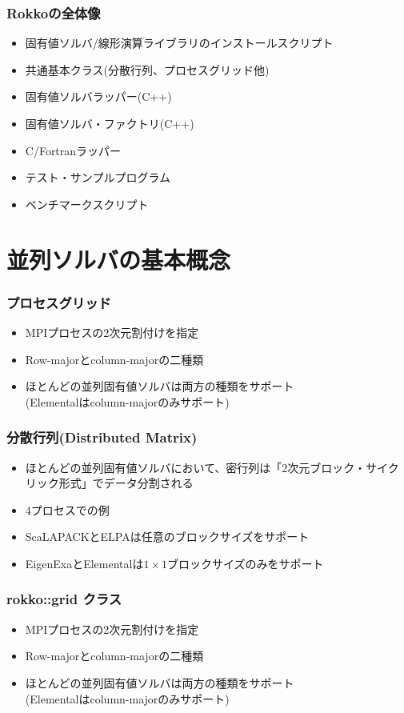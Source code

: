 \begin{frame}
  \frametitle{Rokkoの全体像}
  \begin{itemize}
  \item 固有値ソルバ/線形演算ライブラリのインストールスクリプト
  \item 共通基本クラス(分散行列、プロセスグリッド他)
  \item 固有値ソルバラッパー(C++)
  \item 固有値ソルバ・ファクトリ(C++)
  \item C/Fortranラッパー
  \item テスト・サンプルプログラム
  \item ベンチマークスクリプト
  \end{itemize}
\end{frame}

\section{並列ソルバの基本概念}

\begin{frame}
  \frametitle{プロセスグリッド}
  \begin{itemize}
  \item MPIプロセスの2次元割付けを指定
  \item Row-majorとcolumn-majorの二種類
  \item ほとんどの並列固有値ソルバは両方の種類をサポート \\
    (Elementalはcolumn-majorのみサポート)
  \end{itemize}
\end{frame}

\begin{frame}
  \frametitle{分散行列(Distributed Matrix)}
  \begin{itemize}
  \item ほとんどの並列固有値ソルバにおいて、密行列は「2次元ブロック・サイクリック形式」でデータ分割される
  \item 4プロセスでの例
  \item ScaLAPACKとELPAは任意のブロックサイズをサポート
  \item EigenExaとElementalは$1 \times 1$ブロックサイズのみをサポート
  \end{itemize}
\end{frame}

\begin{frame}
  \frametitle{rokko::grid クラス}
  \begin{itemize}
  \item MPIプロセスの2次元割付けを指定
  \item Row-majorとcolumn-majorの二種類
  \item ほとんどの並列固有値ソルバは両方の種類をサポート \\
    (Elementalはcolumn-majorのみサポート)
  \end{itemize}
\end{frame}

